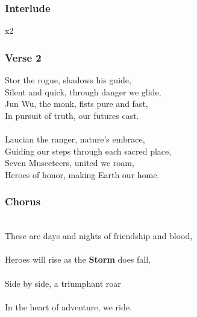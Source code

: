 \documentclass[letterpaper,openany,oneside,twocolumn]{book}
\begin{document}
\subsubsection*{Interlude}
    {\footnotesize x2}

\subsubsection*{Verse 2}
{\entryfont Stor the rogue, shadows his guide,}\\
Silent and quick, through danger we glide,\\
Jun Wu, the monk, fists pure and fast,\\
In pursuit of truth, our futures cast.\\
\\
Laucian the ranger, nature's embrace,\\
Guiding our steps through each sacred place,\\
Seven Musceteers, united we roam,\\
Heroes of honor, making Earth our home.

\subsubsection*{Chorus}
\hspace*{1.5cm}\hspace*{0.9cm}\hspace*{1cm}\hspace*{1.8cm}\\
{\entryfont These are days and nights of friendship and blood,}\\
\hspace*{1.1cm}\hspace*{1.3cm}\hspace*{1.3cm}\\
{\entryfont Heroes will rise as the \textbf{Storm} does fall,}\\
\hspace*{0.85cm}\hspace*{0.4cm}\hspace*{1.3cm}\\
{\entryfont Side by side, a triumphant roar}\\
\hspace*{1.1cm}\hspace*{0.4cm}\hspace*{1.9cm}\\
{\entryfont In the heart of adventure, we ride.}
\vfill\eject
\end{document}

